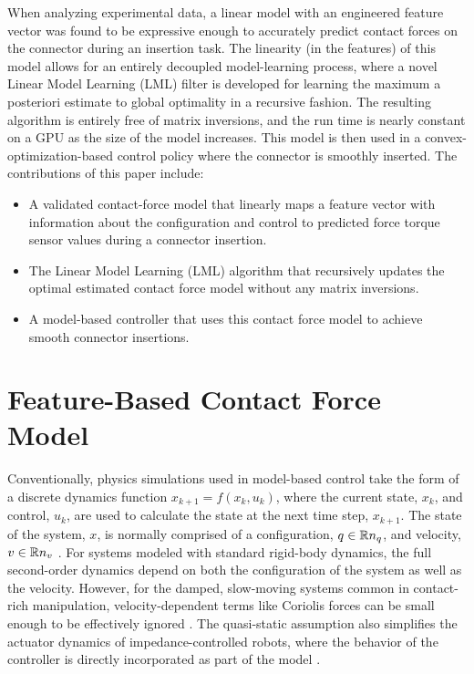 When analyzing experimental data, a linear model with an engineered feature vector was found to be expressive enough to accurately predict contact forces on the connector during an insertion task. The linearity (in the features) of this model allows for an entirely decoupled model-learning process, where a novel Linear Model Learning (LML) filter is developed for learning the maximum a posteriori estimate to global optimality in a recursive fashion. The resulting algorithm is entirely free of matrix inversions, and the run time is nearly constant on a GPU as the size of the model increases. This model is then used in a convex-optimization-based control policy where the connector is smoothly inserted. The contributions of this paper include:
%
\begin{itemize}
\itemsep0em 
    \item A validated contact-force model that linearly maps a feature vector with information about the configuration and control to predicted force torque sensor values during a connector insertion.
    \item The Linear Model Learning (LML) algorithm that recursively updates the optimal estimated contact force model without any matrix inversions. 
    \item A model-based controller that uses this contact force model to achieve smooth connector insertions.
\end{itemize}
%
\section{Feature-Based Contact Force Model} \label{sec:plugging:force-model}
%
Conventionally, physics simulations used in model-based control take the form of a discrete dynamics function $x_{k+1} = f(x_k, u_k)$, where the current state, $x_k$, and control, $u_k$, are used to calculate the state at the next time step, $x_{k+1}$. The state of the system, $x$, is normally comprised of a configuration, $q \in \mathbb{R}{n_q}$, and velocity, $v \in \mathbb{R}{n_v}$ \citep{tedrake2014}. For systems modeled with standard rigid-body dynamics, the full second-order dynamics depend on both the configuration of the system as well as the velocity. However, for the damped,  slow-moving systems common in contact-rich manipulation, velocity-dependent terms like Coriolis forces can be small enough to be effectively ignored \citep{mason2001a}. The quasi-static assumption also simplifies the actuator dynamics of impedance-controlled robots, where the behavior of the controller is directly incorporated as part of the model \citep{pang2018}. 

